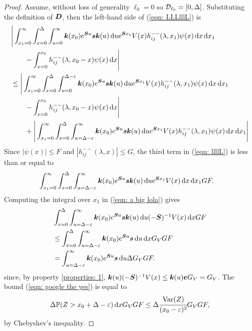 \begin{proof}
	Assume, without loss of generality \(\ell_0=0\) so \(\mathcal{D}_{\ell_0}=[0,\Delta]\). Substituting the definition of \(\boldsymbol D\), then the left-hand side of (\ref{eqn: LLLlllL}) is
	\begin{align}
		&\Bigg|\int_{x_1=0}^\infty \int_{x=0}^{\Delta}\int_{u=0}^\infty \boldsymbol k(x_0)e^{\boldsymbol Su}\boldsymbol s \boldsymbol k(u) \, \mathrm{d} u e^{\boldsymbol S x_1} V(x) h_{ij}^{--}(\lambda, x_1) \psi(x) \, \mathrm{d} x \, \mathrm{d} x_1\nonumber
		\\&{}\qquad {} - \int_{x=0}^{x_0} h_{ij}^{--}(\lambda, x_0 - x)\psi(x)\, \mathrm{d} x\Bigg| \nonumber
		\\&\leq \Bigg|\int_{x_1=0}^\infty \int_{x=0}^{\Delta}\int_{u=0}^{\Delta-\varepsilon} \boldsymbol k(x_0)e^{\boldsymbol Su}\boldsymbol s \boldsymbol k(u) \, \mathrm{d} u e^{\boldsymbol S x_1} V(x) h_{ij}^{--}(\lambda, x_1) \psi(x) \, \mathrm{d} x \, \mathrm{d} x_1\nonumber
		\\&{}\qquad {} - \int_{x=0}^{x_0} h_{ij}^{--}(\lambda, x_0 - x)\psi(x)\, \mathrm{d} x\Bigg| \nonumber
		\\&\qquad {}+\Bigg|\int_{x_1=0}^\infty \int_{x=0}^{\Delta}\int_{u= \Delta-\varepsilon}^\infty  \boldsymbol k(x_0)e^{\boldsymbol Su}\boldsymbol s \boldsymbol k(u) \, \mathrm{d} u e^{\boldsymbol S x_1} V(x) h_{ij}^{--}(\lambda, x_1) \psi(x) \, \mathrm{d} x \, \mathrm{d} x_1\Bigg| \label{eqn: llllL}
	\end{align}
	Since \(|\psi(x)|\leq F\) and \(|h_{ij}^{--}(\lambda,x)|\leq G\), the third term in (\ref{eqn: llllL}) is less than or equal to 
	\begin{align}
		&\int_{x_1=0}^\infty \int_{x=0}^{\Delta}\int_{u= \Delta-\varepsilon}^\infty  \boldsymbol k(x_0)e^{\boldsymbol Su}\boldsymbol s \boldsymbol k(u) \, \mathrm{d} u e^{\boldsymbol S x_1} V(x) \, \mathrm{d} x \, \mathrm{d} x_1G F.\label{eqn: a big lola}
	\end{align} 
	Computing the integral over \(x_1\) in (\ref{eqn: a big lola}) gives
	\begin{align}
		& \int_{x=0}^{\Delta}\int_{u= \Delta-\varepsilon}^\infty  \boldsymbol k(x_0)e^{\boldsymbol Su}\boldsymbol s \boldsymbol k(u) \, \mathrm{d} u (-\boldsymbol S)^{-1}V(x) \, \mathrm{d} x G F\nonumber
		\\&\leq  \int_{x=0}^{\Delta}\int_{u= \Delta-\varepsilon}^\infty  \boldsymbol k(x_0)e^{\boldsymbol Su}\boldsymbol s \, \mathrm{d} u \, \mathrm{d} x G_V G F \nonumber
		\\&= \int_{u= \Delta-\varepsilon}^\infty  \boldsymbol k(x_0)e^{\boldsymbol Su}\boldsymbol s  \, \mathrm{d} u\Delta G_V G F.\label{eqn: google the yes}
	\end{align}
	since, by property \ref{properties: 1}, \(\boldsymbol k(u)(-\boldsymbol S)^{-1}V(x)\leq \boldsymbol k(u)\boldsymbol e G_V=G_V\). The bound (\ref{eqn: google the yes}) is equal to 
	\begin{align}
		\Delta \mathbb P(Z>x_0 + \Delta-\varepsilon) \, \mathrm{d} x G_V G F
		\leq  \Delta \cfrac{\mathrm{Var}(Z)}{(x_0-\varepsilon)^2} G_V G F, \label{eqn: JjJ}
	\end{align}
	by Chebyshev's inequality. 
	

\end{proof}
